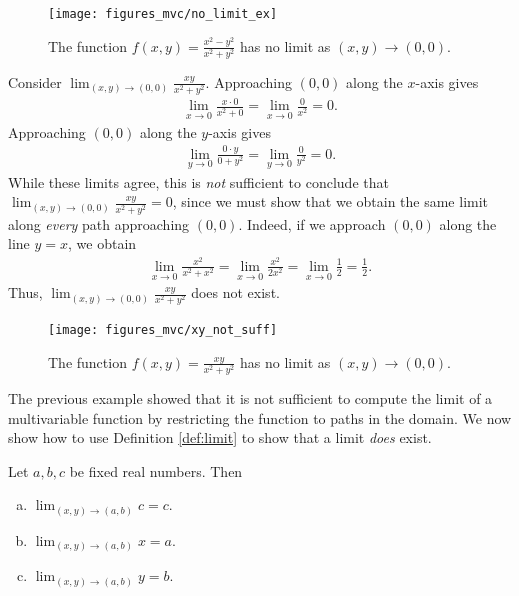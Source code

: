 \documentclass[12pt,letterpaper,reqno]{article}
\numberwithin{equation}{section}
\begin{document}
{\begin{figure}[h]
	\begin{center}
		\texttt{[image: figures\_mvc/no\_limit\_ex]}
	\end{center}
	\caption{The function $f(x,y)=\frac{x^2-y^2}{x^2+y^2}$ has no limit as $(x,y) \to (0,0)$.}
\end{figure}

\begin{example}
	Consider $\lim_{(x,y) \to (0,0)}\frac{xy}{x^2+y^2}$. Approaching $(0,0)$ along the $x$-axis gives
	\begin{align*}
		\lim_{x \to 0} \frac{x \cdot 0}{x^2+0}=\lim_{x \to 0} \frac{0}{x^2}=0.
	\end{align*}
	Approaching $(0,0)$ along the $y$-axis gives
	\begin{align*}
		\lim_{y \to 0} \frac{0 \cdot y}{0+y^2}=\lim_{y \to 0} \frac{0}{y^2}=0.
	\end{align*}
While these limits agree, this is \emph{not} sufficient to conclude that $\lim_{(x,y) \to (0,0)}\frac{xy}{x^2+y^2}=0$, since we must show that we obtain the same limit along \emph{every} path approaching $(0,0)$. Indeed, if we approach $(0,0)$ along the line $y=x$, we obtain
\begin{align*}
	\lim_{x \to 0}\frac{x^2}{x^2+x^2}=\lim_{x \to 0}\frac{x^2}{2x^2}=\lim_{x \to 0}\frac{1}{2}=\frac{1}{2}.
\end{align*}
Thus, $\lim_{(x,y) \to (0,0)}\frac{xy}{x^2+y^2}$ does not exist.
\end{example}

\begin{figure}[h]
	\begin{center}
		\texttt{[image: figures\_mvc/xy\_not\_suff]}
	\end{center}
	\caption{The function $f(x,y)=\frac{xy}{x^2+y^2}$ has no limit as $(x,y) \to (0,0)$.}
\end{figure}
\newpage 
The previous example showed that it is not sufficient to compute the limit of a multivariable function by restricting the function to paths in the domain. We now show how to use Definition \ref{def:limit} to show that a limit \emph{does} exist.

\begin{thm}\label{thm:simple_limits}
Let $a,b,c$ be fixed real numbers. Then
\begin{enumerate}[(a)]
	\item $\lim_{(x,y) \to (a,b)} c=c$.
	\item $\lim_{(x,y) \to (a,b)} x = a$.
	\item $\lim_{(x,y) \to (a,b)} y = b$.
\end{enumerate}	
\end{thm}

}
\end{document}
